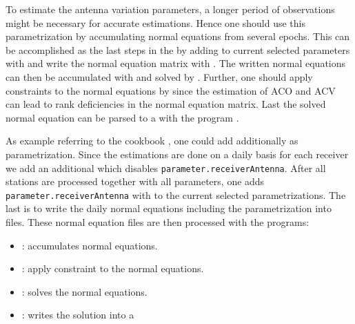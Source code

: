 To estimate the antenna variation parameters, a longer period of observations might be necessary
for accurate estimations. Hence one should use this parametrization by
accumulating normal equations from several epochs.
This can be accomplished as the last steps in the 
 by adding 
to current selected parameters with 
and write the normal equation matrix with .
The written normal equations can then be accumulated with  and solved by .
Further, one should apply constraints to the normal equations by  since the estimation
 of ACO and ACV can lead to rank deficiencies in the normal equation matrix.
Last the solved normal equation can be parsed to a 
 with the program .

As example referring to the cookbook ,
one could add additionally  as parametrization.
Since the estimations are done on a daily basis for each receiver we add an additional
 which
disables \verb|parameter.receiverAntenna|. After all stations are processed together with all parameters, one
adds \verb|parameter.receiverAntenna| with 
 to the current selected parametrizations.
The last  is 
to write the daily normal equations including the parametrization  into files.
These normal equation files are then processed with the programs:

\begin{itemize}
  \item {}: accumulates normal equations.
  \item {}: apply constraint to the normal equations.
  \item {}: solves the normal equations.
  \item {}: writes the solution into a 
\end{itemize}

